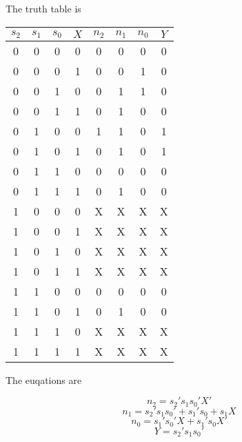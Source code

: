 The truth table is 

\begin{center}
\begin{tabular}{cccc|cccc}
$s_{2}$ & $s_{1}$ & $s_{0}$ & $X$ & $n_{2}$ & $n_{1}$ & $n_{0}$ & $Y$ \\
\hline
0 & 0 & 0 & 0 & 0 & 0 & 0 & 0 \\
0 & 0 & 0 & 1 & 0 & 0 & 1 & 0 \\
0 & 0 & 1 & 0 & 0 & 1 & 1 & 0 \\
0 & 0 & 1 & 1 & 0 & 1 & 0 & 0 \\
0 & 1 & 0 & 0 & 1 & 1 & 0 & 1 \\
0 & 1 & 0 & 1 & 0 & 1 & 0 & 1 \\
0 & 1 & 1 & 0 & 0 & 0 & 0 & 0 \\
0 & 1 & 1 & 1 & 0 & 1 & 0 & 0 \\
1 & 0 & 0 & 0 & X & X & X & X \\
1 & 0 & 0 & 1 & X & X & X & X \\
1 & 0 & 1 & 0 & X & X & X & X \\
1 & 0 & 1 & 1 & X & X & X & X \\
1 & 1 & 0 & 0 & 0 & 0 & 0 & 0 \\
1 & 1 & 0 & 1 & 0 & 1 & 0 & 0 \\
1 & 1 & 1 & 0 & X & X & X & X \\
1 & 1 & 1 & 1 & X & X & X & X \\
\end{tabular}
\end{center}

The euqations are 

$$n_{2}=s_{2}'s_{1}s_{0}'X'$$
$$n_{1}=s_{2}'s_{1}s_{0}'+s_{1}'s_{0}+s_{1}X$$
$$n_{0}=s_{1}'s_{0}'X+s_{1}'s_{0}X'$$
$$Y=s_{2}'s_{1}s_{0}'$$


